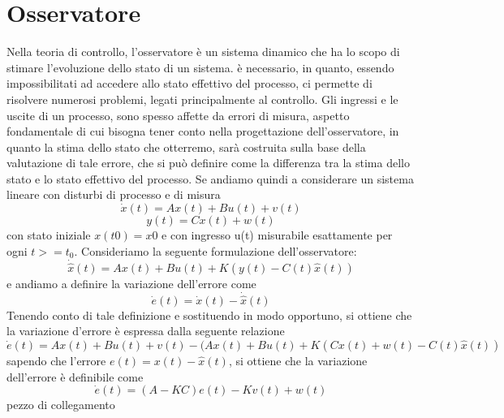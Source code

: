 \documentclass{article}
\begin{document}
\section{Osservatore}
Nella teoria di controllo, l'osservatore è un sistema dinamico che ha lo scopo di stimare l'evoluzione dello stato di un sistema. è necessario, in quanto, essendo impossibilitati ad accedere allo stato effettivo del processo, ci permette di risolvere numerosi problemi, legati principalmente al controllo. Gli ingressi e le uscite di un processo, sono spesso affette da errori di misura, aspetto fondamentale di cui bisogna  tener conto  nella progettazione dell'osservatore, in quanto la stima dello stato che otterremo, sarà costruita sulla base della valutazione di tale errore, che si può definire come la differenza tra la stima dello stato e lo stato effettivo del processo.
Se andiamo quindi a considerare un sistema lineare con disturbi di processo e di misura
\[\dot{x}(t)=Ax(t)+Bu(t)+v(t)\]
\[y(t)=Cx(t)+ w(t)\]
con stato iniziale $x(t0)=x0$ e con ingresso u(t) misurabile  esattamente per ogni $t>=t_{0}$.
Consideriamo la seguente formulazione dell'osservatore:
\[\dot{\hat{x}}(t)=Ax(t)+Bu(t)+K(y(t)-C(t)\hat{x}(t))\]
e andiamo a definire la variazione dell'errore come  
\[\dot{e}(t)=\dot{x}(t)-\dot{\hat{x}}(t)\]
Tenendo conto di tale definizione e sostituendo in modo opportuno, si ottiene che la variazione d'errore è espressa dalla seguente relazione
\[\dot{e}(t)=Ax(t)+Bu(t)+v(t)-(Ax(t)+Bu(t)+K(Cx(t)+w(t)-C(t)\hat{x}(t))\]
sapendo che l'errore $e(t)=x(t)-\hat{x}(t)$, si ottiene che la variazione dell'errore è definibile come 
\[\dot{e}(t)=(A-KC)e(t)-Kv(t)+w(t)\]
pezzo di collegamento



 
\end{document}
